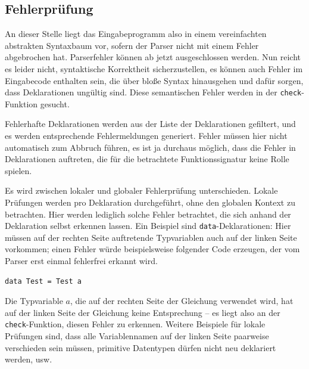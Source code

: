 \subsection{Fehlerprüfung}

\label{sec:check}

An dieser Stelle liegt das Eingabeprogramm also in einem vereinfachten abstrakten Syntaxbaum vor, sofern der Parser nicht mit
einem Fehler abgebrochen hat. Parserfehler können ab jetzt ausgeschlossen werden.
Nun reicht es leider nicht, syntaktische Korrektheit sicherzustellen, es können auch Fehler im Eingabecode enthalten sein,
die über bloße Syntax hinausgehen und dafür sorgen, dass Deklarationen ungültig sind. Diese semantischen Fehler werden
in der \texttt{check}-Funktion gesucht.

Fehlerhafte Deklarationen werden aus der Liste der Deklarationen gefiltert, und es werden entsprechende Fehlermeldungen
generiert. Fehler müssen hier nicht automatisch zum Abbruch führen, es ist ja durchaus möglich, dass die Fehler in Deklarationen
auftreten, die für die betrachtete Funktionssignatur keine Rolle spielen.

Es wird zwischen lokaler und globaler Fehlerprüfung unterschieden. Lokale Prüfungen werden pro Deklaration durchgeführt,
ohne den globalen Kontext zu betrachten. Hier werden lediglich solche Fehler betrachtet, die sich anhand der Deklaration selbst
erkennen lassen. Ein Beispiel sind \texttt{data}-Deklarationen: Hier müssen auf der rechten Seite auftretende Typvariablen
auch auf der linken Seite vorkommen; einen Fehler würde beispielsweise folgender Code erzeugen, der vom Parser erst einmal
fehlerfrei erkannt wird.

\begin{verbatim}
data Test = Test a
\end{verbatim}

Die Typvariable $a$, die auf der rechten Seite der Gleichung verwendet wird, hat auf der linken Seite der Gleichung keine
Entsprechung -- es liegt also an der \texttt{check}-Funktion, diesen Fehler zu erkennen. Weitere Beispiele für lokale Prüfungen
sind, dass alle Variablennamen auf der linken Seite paarweise verschieden sein müssen, primitive Datentypen dürfen nicht
neu deklariert werden, usw.

